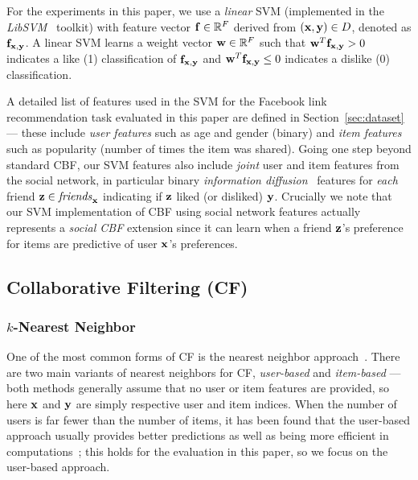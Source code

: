 For the experiments in this paper, we use a \emph{linear} SVM
(implemented in the \emph{LibSVM}~\cite{libsvm} toolkit) with feature
vector $\mathbf{f} \in \mathbb{R}^F$ derived from $(\mathbf{x},\mathbf{y}) \in D$, denoted as
$\mathbf{f}_{\mathbf{x},\mathbf{y}}$.  A linear SVM learns a weight vector $\mathbf{w} \in
\mathbb{R}^F$ such that $\mathbf{w}^T \mathbf{f}_{\mathbf{x},\mathbf{y}} > 0$ indicates a 
like (1) classification of $\mathbf{f}_{\mathbf{x},\mathbf{y}}$ and $\mathbf{w}^T \mathbf{f}_{\mathbf{x},\mathbf{y}} \leq 0$
indicates a dislike (0) classification.

A detailed list of features used in the SVM for the Facebook link
recommendation task evaluated in this paper are defined in
Section~\ref{sec:dataset} --- these include \emph{user features} such
as age and gender (binary) and \emph{item features} such as popularity
(number of times the item was shared).  Going one step beyond standard
CBF, our SVM features also include \emph{joint} user and item
features from the social network, in particular binary 
\emph{information diffusion}~\cite{inf_diffusion} features
for \emph{each} friend $\mathbf{z} \in \mathit{friends}_{\mathbf{x}}$ indicating if $\mathbf{z}$
liked (or disliked) $\mathbf{y}$.  Crucially we note that our SVM
implementation of CBF using social network features actually
represents a \emph{social CBF} extension since it can learn when a friend
$\mathbf{z}$'s preference for items are predictive of user $\mathbf{x}$'s preferences.

\subsection{Collaborative Filtering (CF)}

\subsubsection{$k$-Nearest Neighbor}
\label{sec:nn}

One of the most common forms of CF is the nearest neighbor
approach~\cite{bellkor}. 
There are two main variants of nearest neighbors for
CF, \emph{user-based} and \emph{item-based} --- both
methods generally assume that no user or item features are provided,
so here $\mathbf{x}$ and $\mathbf{y}$ are simply respective user and item indices.
When the
number of users is far fewer than the number of items, it has been
found that the user-based approach usually provides better predictions
as well as being more efficient in computations~\cite{bellkor};
this holds for the evaluation in this paper, so 
we focus on the user-based approach.

